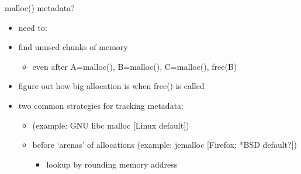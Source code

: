 \begin{frame}{malloc() metadata?}
    \begin{itemize}
    \item need to:
    \vspace{.5cm}
    \item find unused chunks of memory
        \begin{itemize}
        \item even after A=malloc(), B=malloc(), C=malloc(), free(B)
        \end{itemize}
    \item figure out how big allocation is when free() is called
    \vspace{.5cm}
    \item two common strategies for tracking metadata:
        \begin{itemize}
        \item {} (example: GNU libc malloc [Linux default])
        \item before `arenas' of allocations (example: jemalloc [Firefox; *BSD default?])
            \begin{itemize}
            \item lookup by rounding memory address
            \end{itemize}
        \end{itemize}
    \end{itemize}
\end{frame}


